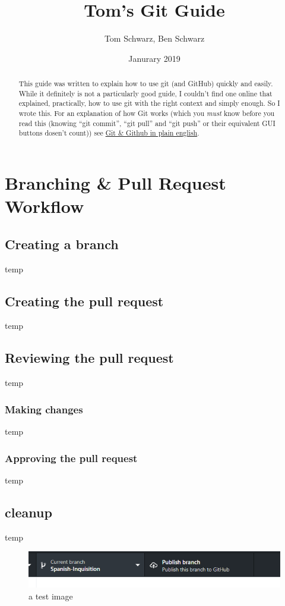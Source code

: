 \documentclass[a4paper, titlepage]{article}
\title{Tom's Git Guide}
\author{Tom Schwarz, Ben Schwarz}
\date{Janurary 2019}
\begin{document}
\maketitle
\renewcommand{\abstractname}{Introduction} %
\begin{abstract}
This guide was written to explain how to use git (and GitHub) quickly and easily. While it definitely is not a particularly good guide, I couldn't find one online that explained, practically, how to use git with the right context and simply enough. So I wrote this. For an explanation of how Git works (which you \emph{must} know before you read this (knowing ``git commit'', ``git pull'' and ``git push'' or their equivalent GUI buttons dosen't count)) see \href{https://blog.red-badger.com/2016/11/29/gitgithub-in-plain-english}{Git \& Github in plain english}.
\end{abstract}

\tableofcontents

\section{Branching \& Pull Request Workflow}
\subsection{Creating a branch}
temp

\subsection{Creating the pull request}
temp

\subsection{Reviewing the pull request}
temp

\subsubsection{Making changes}
temp

\subsubsection{Approving the pull request}
temp

\subsection{cleanup}
temp

\begin{figure}[h]
	\centering
	\includegraphics{test-image}
	\caption{a test image}
\end{figure}
\end{document}
